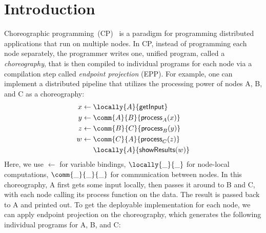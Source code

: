 \section{Introduction}

Choreographic programming~(CP)~\citep{montesi-2013, montesi-2023} is a paradigm for programming distributed applications that run on multiple nodes.
%
In CP, instead of programming each node separately, the programmer writes one, unified program, called a \emph{choreography}, that is then compiled to individual programs for each node via a compilation step called \emph{endpoint projection} (EPP).
%
For example, one can implement a distributed pipeline that utilizes the processing power of nodes A, B, and C as a choreography:
%
\begin{equation*}
  \begin{split}
    x \leftarrow \; & \locally{A}{\mathsf{getInput}} \\
    y \leftarrow \; & \comm{A}{B}{\mathsf{process}_A(x)} \\
    z \leftarrow \; & \comm{B}{C}{\mathsf{process}_B(y)} \\
    w \leftarrow \; & \comm{C}{A}{\mathsf{process}_C(z)} \\
                    & \locally{A}{\mathsf{showResults}(w)} \\
  \end{split}
\end{equation*}
%
Here, we use $\leftarrow$ for variable bindings, $\locally{\_}{\_}$ for node-local computations, $\comm{\_}{\_}{\_}$ for communication between nodes.
%
In this choreography, A first gets some input locally, then passes it around to B and C, with each node calling its process function on the data.
%
The result is passed back to A and printed out.
%
To get the deployable implementation for each node, we can apply endpoint projection on the choreography, which generates the following individual programs for A, B, and C:
%
